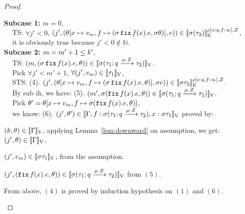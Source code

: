 \documentclass[a4paper,11pt]{article}
\theoremstyle{definition}
\begin{document}
\begin{proof}
\begin{mainitem}
{\bf Subcase 1:} $m = 0$,\\
	$~~~~$ TS: $\forall j' < 0$, $(j', (\env[x \mapsto \valr_m, f \mapsto (\ienv \efix f(x).\expr, \ienv \env)], \expr)) \in \lre{\dmap[x: \nnatbiA, f : \infty]}{\nnatA}{\ienv (\type_2)}$,\\
	$~~~~$ it is obviously true because $j' < 0 \notin \mathbb{N}$.\\
{\bf Subcase 2:} $m = m' + 1 \leq \stepiA'$,\\
	$~~~~$ TS: $ (m, (\ienv \efix f(x). \expr, \env)) \in \lrv{\ienv (\tarr{\type_1}{\type_2}{\nnatbiA}{\dmap}{\nnatA})}$.\\
	$~~~~$ Pick $\forall j' < m' + 1$, $\forall (j', \valr_m) \in \lrv{\type_1}$,\\
	$~~~~$ STS: (4). $(j', (\env[x \mapsto \valr_m, f \mapsto (\ienv \efix f(x).\expr, \env)], \ienv \expr)) \in \lre{\dmap[x: \nnatbiA, f: \infty]}{\nnatA}{\ienv \type_2} $.\\
	$~~~~$ By sub ih, we have:
	(5). $(m', \ienv( \efix f(x). \expr, \env)) \in \lrv{\ienv (\tarr{\type_1}{\type_2}{\nnatbiA}{\dmap}{\nnatA})}$.\\
	$~~~~$ Pick $\env' = \env[x \mapsto \valr_m, f \mapsto \ienv ( \efix f(x).\expr, \env)]$,\\
	$~~~~$ we know: (6). $(j', \env') \in \lrv{\Gamma,
          f:\ienv (\tarr{\type_1}{\type_2}{\nnatbiA}{\dmap}{\nnatA}),  x:
          \ienv  \type_1}$ proved by:
    \begin{enumih}	
	\item $ (\stepiA, \env) \in \lrv{\Gamma}$, applying Lemma~\ref{lem:downward} on assumption, we get: $(j', \env) \in \lrv{\Gamma}$.
	
	\item $(j', \valr_m) \in \lrv{\ienv \type_1}$, from the assumption.
	
	\item $(j', (\efix f(x). \expr, \env)) \in \lrv{\ienv (\tarr{\type_1}{\type_2}{\nnatbiA}{\dmap}{\nnatA})}$ from $(5)$.\\
	\end{enumih}
From above, $(4)$ is proved by induction hypothesis on $(1)$ and $(6)$.\\
%



\end{mainitem}
\end{proof}
\end{document}
